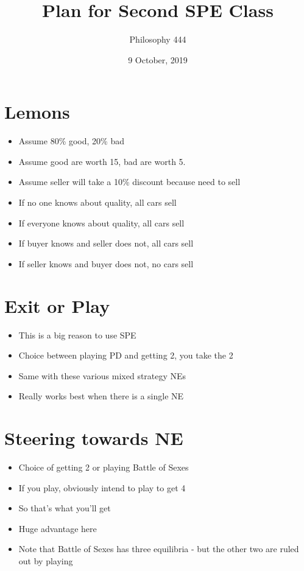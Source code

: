 \documentclass[11pt,]{article}
\title{Plan for Second SPE Class}
\author{Philosophy 444}
\date{9 October, 2019}
\providecommand{\tightlist}{%
  \setlength{\itemsep}{0pt}\setlength{\parskip}{0pt}}
\begin{document}
\maketitle

\hypertarget{lemons}{%
\section{Lemons}\label{lemons}}

\begin{itemize}
\tightlist
\item
  Assume 80\% good, 20\% bad
\item
  Assume good are worth 15, bad are worth 5.
\item
  Assume seller will take a 10\% discount because need to sell
\item
  If no one knows about quality, all cars sell
\item
  If everyone knows about quality, all cars sell
\item
  If buyer knows and seller does not, all cars sell
\item
  If seller knows and buyer does not, no cars sell
\end{itemize}

\hypertarget{exit-or-play}{%
\section{Exit or Play}\label{exit-or-play}}

\begin{itemize}
\tightlist
\item
  This is a big reason to use SPE
\item
  Choice between playing PD and getting 2, you take the 2
\item
  Same with these various mixed strategy NEs
\item
  Really works best when there is a single NE
\end{itemize}

\hypertarget{steering-towards-ne}{%
\section{Steering towards NE}\label{steering-towards-ne}}

\begin{itemize}
\tightlist
\item
  Choice of getting 2 or playing Battle of Sexes
\item
  If you play, obviously intend to play to get 4
\item
  So that's what you'll get
\item
  Huge advantage here
\item
  Note that Battle of Sexes has three equilibria - but the other two are
  ruled out by playing
\end{itemize}
\end{document}
